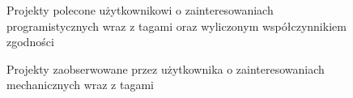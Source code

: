 \begin{figure}[h!]
	\caption{Projekty polecone użytkownikowi o zainteresowaniach programistycznych wraz z tagami oraz wyliczonym współczynnikiem zgodności}
	\centering
\end{figure}





\begin{figure}[h!]
	\caption{Projekty zaobserwowane przez użytkownika o zainteresowaniach mechanicznych wraz z tagami}
	\centering
\end{figure}

